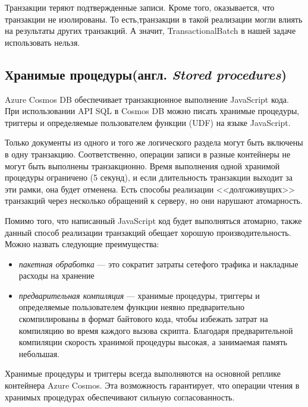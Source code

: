 \documentclass[12pt,  openany]{book}
\begin{document}
\par Транзакции теряют подтвержденные записи.  Кроме того, оказывается, что транзакции не изолированы. То есть,транзакции в такой реализации могли влиять на результаты других транзакций.
А значит, TransactionalBatch в нашей задаче использовать нельзя.

\subsection{Хранимые процедуры(англ. \textit{Stored procedures})}
Azure Cosmos DB обеспечивает транзакционное выполнение JavaScript кода. При использовании API SQL в  Cosmos DB можно писать хранимые процедуры, триггеры и определяемые пользователем функции (UDF) на языке JavaScript. 
\par Только документы из одного и того же логического раздела могут быть включены в одну транзакцию.  Соответственно, операции записи в разные контейнеры не могут быть выполнены транзакционно. Время выполнения одной хранимой процедуры ограничено (5 секунд), и если длительность транзакции выходит за эти рамки, она будет отменена. Есть способы реализации <<долгоживущих>> транзакций через несколько обращений к серверу, но они нарушают атомарность.
\par Помимо того, что написанный JavaScript код будет выполняться атомарно, также данный  способ реализации транзакций обещает хорошую производительность. Можно назвать следующие преимущества:
\begin{itemize}
\item \textit{пакетная обработка} --- это сократит затраты сетефого трафика и накладные расходы на хранение
\item  \textit{предварительная компиляция} --- хранимые процедуры, триггеры и определяемые пользователем функции неявно предварительно скомпилированы в формат байтового кода, чтобы избежать затрат на компиляцию во время каждого вызова скрипта. Благодаря предварительной компиляции скорость хранимой процедуры высокая, а занимаемая память небольшая.
\end{itemize}
\par
Хранимые процедуры и триггеры всегда выполняются на основной реплике контейнера Azure Cosmos. Эта возможность гарантирует, что операции чтения в хранимых процедурах обеспечивают сильную согласованность. 
\end{document}
